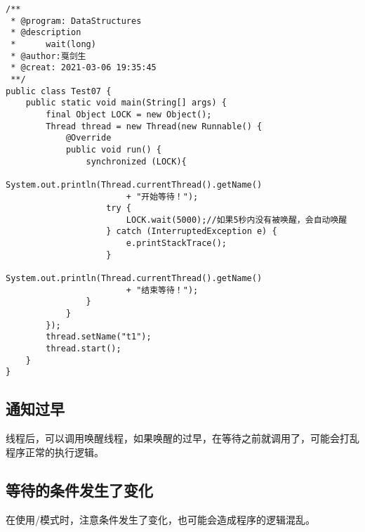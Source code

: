 \documentclass[a4paper]{report}
\begin{document}
\begin{Verbatim}[frame=single,numbersep=5pt,xleftmargin=1.5em,xrightmargin=1.5em]
/**
 * @program: DataStructures
 * @description
 *      wait(long)
 * @author:戛剑生
 * @creat: 2021-03-06 19:35:45
 **/
public class Test07 {
    public static void main(String[] args) {
        final Object LOCK = new Object();
        Thread thread = new Thread(new Runnable() {
            @Override
            public void run() {
                synchronized (LOCK){
                    System.out.println(Thread.currentThread().getName()
                        + "开始等待！");
                    try {
                        LOCK.wait(5000);//如果5秒内没有被唤醒，会自动唤醒
                    } catch (InterruptedException e) {
                        e.printStackTrace();
                    }
                    System.out.println(Thread.currentThread().getName()
                        + "结束等待！");
                }
            }
        });
        thread.setName("t1");
        thread.start();
    }
}
\end{Verbatim}
\subsection{通知过早}
线程后，可以调用唤醒线程，如果唤醒的过早，在等待之前就调用了，可能会打乱程序正常的执行逻辑。
\subsection{等待的条件发生了变化}
在使用/模式时，注意条件发生了变化，也可能会造成程序的逻辑混乱。
\end{document}
